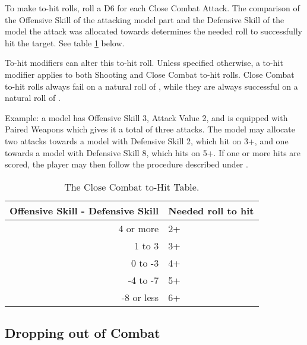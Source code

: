 To make to-hit rolls, roll a D6 for each Close Combat Attack. The comparison of the Offensive Skill of the attacking model part and the Defensive Skill of the model the attack was allocated towards determines the needed roll to successfully hit the target. See table \ref{table/close_combat_to_hit_table} below. 
\par
To-hit modifiers can alter this to-hit roll. Unless specified otherwise, a to-hit modifier applies to both Shooting and Close Combat to-hit rolls. Close Combat to-hit rolls always fail on a natural roll of , while they are always successful on a natural roll of .
\par
Example: a model has Offensive Skill 3, Attack Value 2, and is equipped with Paired Weapons which gives it a total of three attacks. The model may allocate two attacks towards a model with Defensive Skill 2, which hit on 3+, and one towards a model with Defensive Skill 8, which hits on 5+. If one or more hits are scored, the player may then follow the procedure described under .

\begin{table}[!htbp]
\centering
\begin{tabular}{r l}
  Offensive Skill - Defensive Skill & Needed roll to hit\\
  \midrule
  4 or more & 2+ \\
  1 to 3 & 3+ \\
  0 to -3 & 4+\\
  -4 to -7 & 5+\\
  -8 or less & 6+\\
\end{tabular}
\caption{The Close Combat to-Hit Table.}
\label{table/close_combat_to_hit_table}
\end{table}

\newpage
\subsection{Dropping out of Combat}
\label{dropping_out_of_combat}

